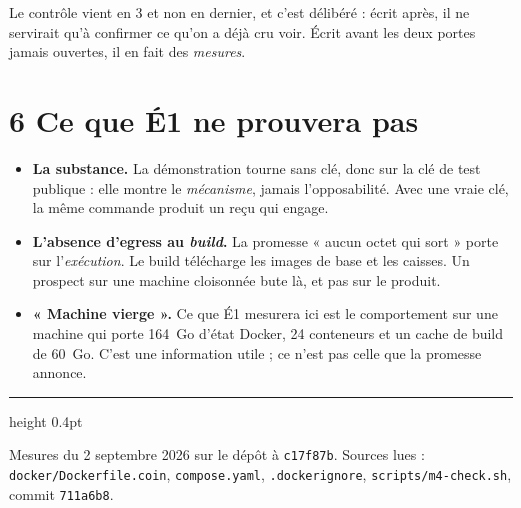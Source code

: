 \documentclass[11pt]{article}
\newcommand{\code}[1]{\texttt{\small #1}}
\begin{document}
Le contrôle vient en 3 et non en dernier, et c'est délibéré : écrit après, il ne servirait qu'à
confirmer ce qu'on a déjà cru voir. Écrit avant les deux portes jamais ouvertes, il en fait des
\emph{mesures}.

\section{6 \;\textbar\; Ce que \mbox{É1} ne prouvera pas}

\begin{itemize}[leftmargin=1.1em,itemsep=1.5pt,topsep=2pt]
\item \textbf{La substance.} La démonstration tourne sans clé, donc sur la clé de test publique :
      elle montre le \emph{mécanisme}, jamais l'opposabilité. Avec une vraie clé, la même commande
      produit un reçu qui engage.
\item \textbf{L'absence d'egress au \emph{build}.} La promesse « aucun octet qui sort » porte sur
      l'\emph{exécution}. Le build télécharge les images de base et les caisses. Un prospect sur une
      machine cloisonnée bute là, et pas sur le produit.
\item \textbf{« Machine vierge ».} Ce que \mbox{É1} mesurera ici est le comportement sur une machine
      qui porte 164~Go d'état Docker, 24 conteneurs et un cache de build de 60~Go. C'est une
      information utile ; ce n'est pas celle que la promesse annonce.
\end{itemize}

\vspace{4pt}
{\color{efegray}\hrule height 0.4pt}
\vspace{2.5pt}
{\footnotesize\color{efegray}Mesures du 2 septembre 2026 sur le dépôt à \code{c17f87b}.
Sources lues : \code{docker/Dockerfile.coin}, \code{compose.yaml}, \code{.dockerignore},
\code{scripts/m4-check.sh}, commit \code{711a6b8}.}
\end{document}
